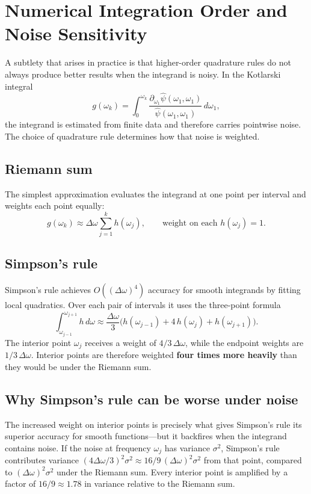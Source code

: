 \documentclass[11pt]{article}
\newcommand{\psihat}{\hat{\psi}}
\begin{document}
\section{Numerical Integration Order and Noise Sensitivity}

A subtlety that arises in practice is that higher-order quadrature rules
do not always produce better results when the integrand is noisy.  In the
Kotlarski integral
\[
    g(\omega_k) = \int_0^{\omega_k}
    \frac{\partial_{\omega_1}\psihat(\omega_1,\omega_1)}{\psihat(\omega_1,\omega_1)}\,d\omega_1,
\]
the integrand is estimated from finite data and therefore carries
pointwise noise.  The choice of quadrature rule determines how that noise
is weighted.

\subsection*{Riemann sum}

The simplest approximation evaluates the integrand at one point per
interval and weights each point equally:
\[
    g(\omega_k) \approx \Delta\omega \sum_{j=1}^{k} h(\omega_j),
    \qquad \text{weight on each } h(\omega_j) = 1.
\]

\subsection*{Simpson's rule}

Simpson's rule achieves $O((\Delta\omega)^4)$ accuracy for smooth
integrands by fitting local quadratics.  Over each pair of intervals it
uses the three-point formula
\[
    \int_{\omega_{j-1}}^{\omega_{j+1}} h\,d\omega
    \approx \frac{\Delta\omega}{3}\bigl(h(\omega_{j-1})
    + 4\,h(\omega_j) + h(\omega_{j+1})\bigr).
\]
The interior point $\omega_j$ receives a weight of $4/3\,\Delta\omega$,
while the endpoint weights are $1/3\,\Delta\omega$.  Interior points are
therefore weighted \textbf{four times more heavily} than they would be
under the Riemann sum.

\subsection*{Why Simpson's rule can be worse under noise}

The increased weight on interior points is precisely what gives Simpson's
rule its superior accuracy for smooth functions---but it backfires when
the integrand contains noise.  If the noise at frequency $\omega_j$ has
variance $\sigma^2$, Simpson's rule contributes variance
$(4\Delta\omega/3)^2\sigma^2 \approx 16/9\,(\Delta\omega)^2\sigma^2$ from
that point, compared to $(\Delta\omega)^2\sigma^2$ under the Riemann sum.
Every interior point is amplified by a factor of $16/9 \approx 1.78$ in
variance relative to the Riemann sum.
\end{document}
